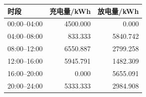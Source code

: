 \begin{tabular}{lrr}
\toprule
时段 & 充电量/kWh & 放电量/kWh \\
\midrule
00:00--04:00 & 4500.000 & 0.000 \\
04:00--08:00 & 833.333 & 5840.742 \\
08:00--12:00 & 6550.887 & 2799.258 \\
12:00--16:00 & 5945.791 & 1482.309 \\
16:00--20:00 & 0.000 & 5655.091 \\
20:00--24:00 & 5333.333 & 2984.908 \\
\bottomrule
\end{tabular}
